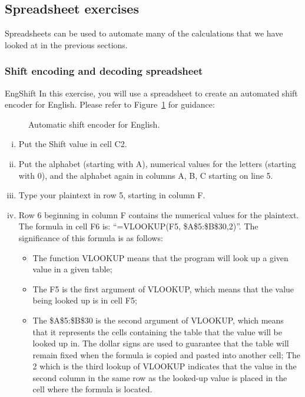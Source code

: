 \subsection{Spreadsheet exercises}
Spreadsheets can be used to automate many of the calculations that we have looked at in the previous sections.

\subsubsection*{Shift encoding and decoding spreadsheet \quad {}}
\label{sec:Cryptography:PrivateKey:ShiftCodeAndDecodeSpreadsheet}


\begin{exercise}{EngShift}
In this exercise, you will use a spreadsheet to create an automated shift encoder for English. Please refer to Figure~\ref{fig:AutoShiftEnc} for guidance:
\begin{figure}[h]
\caption{Automatic shift encoder for English.}
\label{fig:AutoShiftEnc}
\end{figure}
\begin{enumerate}[(i)]
\item
Put the Shift value in cell C2.
\item
Put the alphabet (starting with A), numerical values for the letters (starting with 0), and the alphabet again in columns A, B, C starting on line 5.
\item
Type your plaintext in row 5, starting in column F.
\item
Row 6 beginning in column F contains the numerical values for the plaintext. The formula in cell F6 is: ``=VLOOKUP(F5, \$A\$5:\$B\$30,2)''. The significance of this formula is as follows:
\begin{itemize}
\item
The function VLOOKUP means that the program will look up a given value in a given table;
\item
The F5 is the first argument of VLOOKUP, which means that the value being looked up is in cell F5;
\item
The \$A\$5:\$B\$30 is the second argument of VLOOKUP, which means that it represents the cells containing the table that the value will be looked up in.  The dollar signs are used to guarantee that the table will remain fixed when the formula is copied and pasted into another cell;
The 2 which is the third lookup of VLOOKUP indicates that the value in the second column in the same row as the looked-up value is placed in the cell where the formula is located.

\end{itemize}
\end{enumerate}
\end{exercise}
